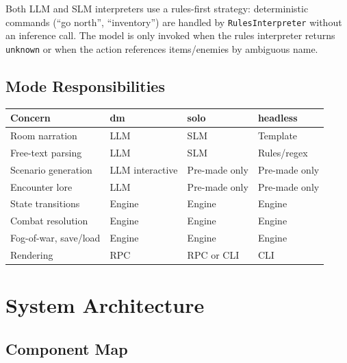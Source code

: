 \documentclass[a4paper,10pt]{article}
\begin{document}
Both LLM and SLM interpreters use a rules-first strategy:
deterministic commands (``go north'', ``inventory'') are handled by
\texttt{RulesInterpreter} without an inference call.  The model is
only invoked when the rules interpreter returns \texttt{unknown} or
when the action references items/enemies by ambiguous name.

\subsection{Mode Responsibilities}

\begin{center}
\begin{tabular}{lp{2.8cm}p{2.8cm}p{2.8cm}}
\toprule
\textbf{Concern} & \textbf{dm} & \textbf{solo} & \textbf{headless} \\
\midrule
Room narration        & LLM             & SLM             & Template \\
Free-text parsing     & LLM             & SLM             & Rules/regex \\
Scenario generation   & LLM interactive & Pre-made only   & Pre-made only \\
Encounter lore        & LLM             & Pre-made only   & Pre-made only \\
State transitions     & Engine          & Engine          & Engine \\
Combat resolution     & Engine          & Engine          & Engine \\
Fog-of-war, save/load & Engine          & Engine          & Engine \\
Rendering             & RPC             & RPC or CLI      & CLI \\
\bottomrule
\end{tabular}
\end{center}

\section{System Architecture}

\subsection{Component Map}
\end{document}
